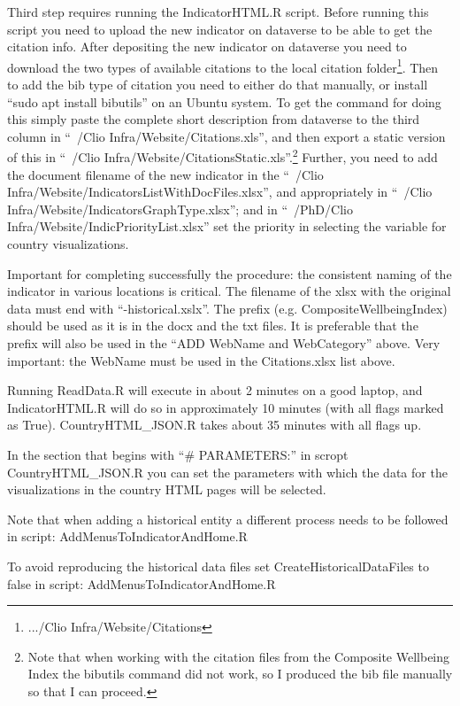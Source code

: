 \documentclass[a4paper]{article}
\begin{document}
Third step requires running the IndicatorHTML.R script. Before running this 
script you need to upload the new indicator on dataverse to be able to get the 
citation info. After depositing the new indicator on dataverse you need to 
download the two types of available citations to the local citation 
folder\footnote{.../Clio Infra/Website/Citations}. Then to add the bib type of 
citation you need to either do that manually, or install ``sudo apt install 
bibutils'' on an Ubuntu system. To get the command for doing this simply paste 
the complete short description from dataverse to the third column in ``~/Clio 
Infra/Website/Citations.xls'', and then export a static version of this in 
``~/Clio Infra/Website/CitationsStatic.xls''.\footnote{Note that when working 
with the citation files from the Composite Wellbeing Index the bibutils command 
did not work, so I produced the bib file manually so that I can proceed.} 
Further, you need to add the document filename of the new indicator in the 
``~/Clio Infra/Website/IndicatorsListWithDocFiles.xlsx'', and appropriately in 
``~/Clio Infra/Website/IndicatorsGraphType.xlsx''; and in ``~/PhD/Clio 
Infra/Website/IndicPriorityList.xlsx'' set the priority in selecting the 
variable for country visualizations. 

Important for completing successfully the procedure: the consistent naming of 
the indicator in various locations is critical. The filename of the xlsx with 
the original data must end with ``-historical.xslx''. The prefix (e.g. 
CompositeWellbeingIndex) should be used as it is in the docx and the txt files. 
It is preferable that the prefix will also be used in the ``ADD WebName and 
WebCategory'' above. Very important: the WebName must be used in the 
Citations.xlsx list above.

Running ReadData.R will execute in about 2 minutes on a good laptop, and 
IndicatorHTML.R will do so in approximately 10 minutes (with all flags marked 
as True). CountryHTML\_JSON.R takes about 35 minutes with all flags up.

In the section that begins with ``\# PARAMETERS:'' in scropt CountryHTML\_JSON.R
you can set the parameters with which the data for the visualizations in the 
country HTML pages will be selected.

Note that when adding a historical entity a different process needs to be 
followed in script: AddMenusToIndicatorAndHome.R

To avoid reproducing the historical data files set CreateHistoricalDataFiles to 
false in script: AddMenusToIndicatorAndHome.R
\end{document}
